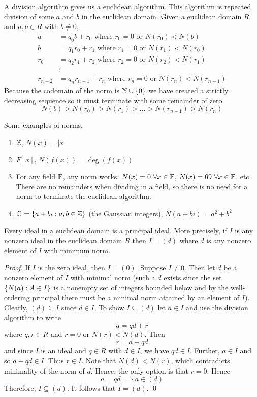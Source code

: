 A division algorithm gives us a euclidean algorithm. This algorithm is repeated division of some $a$ and $b$ in the euclidean domain. Given a euclidean domain $R$ and $a,b \in R$ with $b\neq 0$,
\begin{align*}
    a &= q_0b + r_0 \text{ where $r_0 = 0$ or $N(r_0) < N(b)$} \\
    b &= q_1r_0 + r_1 \text{ where $r_1 = 0$ or $N(r_1) < N(r_0)$} \\
    r_0 &= q_2r_1 + r_2 \text{ where $r_2 = 0$ or $N(r_2) < N(r_1)$} \\
    &\vdots \\
    r_{n-2} &= q_nr_{n-1} + r_n \text{ where $r_n = 0$ or $N(r_n) < N(r_{n-1})$}
\end{align*}
Because the codomain of the norm is $\mathbb{N}\cup \left\{0\right\}$ we have created a strictly decreasing sequence so it must terminate with some remainder of zero.
$$N(b) > N(r_0) > N(r_1) > ... > N(r_{n-1}) > N(r_n)$$

\begin{example} Some examples of norms.
    \begin{enumerate}
        \item $\mathbb{Z}$, $N(x) = |x|$
        \item $F[x]$, $N(f(x)) = \deg(f(x))$
        \item For any field $\mathbb{F}$, any norm works: $N(x) = 0 ~\forall x \in \mathbb{F}$, $N(x) = 69 ~\forall x \in \mathbb{F}$, etc. There are no remainders when dividing in a field, so there is no need for a norm to terminate the euclidean algorithm.
        \item $\mathbb{G} = \left\{a+bi : a,b\in \mathbb{Z}\right\}$ (the Gaussian integers), $N(a+bi) = a^2 + b^2$
    \end{enumerate}
\end{example}

\begin{proposition}
    Every ideal in a euclidean domain is a principal ideal. More precisely, if $I$ is any nonzero ideal in the euclidean domain $R$ then $I = (d)$ where $d$ is any nonzero element of $I$ with minimum norm.
\end{proposition}

\begin{proof}
    If $I$ is the zero ideal, then $I=(0)$. Suppose $I\neq 0$. Then let $d$ be a nonzero element of $I$ with minimal norm (such a $d$ exists since the set $\left\{N(a) : A \in I\right\}$ is a nonempty set of integers bounded below and by the well-ordering principal there must be a minimal norm attained by an element of $I$). Clearly, $(d) \subseteq I$ since $d\in I$. To show $I \subseteq (d)$ let $a \in I$ and use the division algorithm to write
    $$a = qd +r$$
    where $q,r \in R$ and $r = 0$ or $N(r) < N(d)$. Then 
    $$r = a - qd$$
    and since $I$ is an ideal and $q\in R$ with $d\in I$, we have $qd \in I$. Further, $a\in I$ and so $a-qd\in I$. Thus $r \in I$. Note that $N(d) < N(r)$, which contradicts minimality of the norm of $d$. Hence, the only option is that $r = 0$. Hence
    $$a=qd \implies a\in (d)$$
    Therefore, $I \subseteq (d)$. It follows that $I = (d).$
    \qed
\end{proof}
